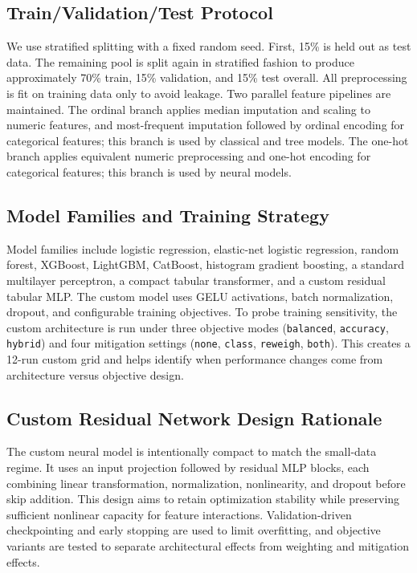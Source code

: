 ﻿\documentclass[11pt]{article}
\begin{document}
\subsection{Train/Validation/Test Protocol}
We use stratified splitting with a fixed random seed. First, 15\% is held out as test data. The remaining pool is split again in stratified fashion to produce approximately 70\% train, 15\% validation, and 15\% test overall. All preprocessing is fit on training data only to avoid leakage. Two parallel feature pipelines are maintained. The ordinal branch applies median imputation and scaling to numeric features, and most-frequent imputation followed by ordinal encoding for categorical features; this branch is used by classical and tree models. The one-hot branch applies equivalent numeric preprocessing and one-hot encoding for categorical features; this branch is used by neural models.

\subsection{Model Families and Training Strategy}
Model families include logistic regression, elastic-net logistic regression, random forest, XGBoost, LightGBM, CatBoost, histogram gradient boosting, a standard multilayer perceptron, a compact tabular transformer, and a custom residual tabular MLP. The custom model uses GELU activations, batch normalization, dropout, and configurable training objectives. To probe training sensitivity, the custom architecture is run under three objective modes (\texttt{balanced}, \texttt{accuracy}, \texttt{hybrid}) and four mitigation settings (\texttt{none}, \texttt{class}, \texttt{reweigh}, \texttt{both}). This creates a 12-run custom grid and helps identify when performance changes come from architecture versus objective design.

\subsection{Custom Residual Network Design Rationale}
The custom neural model is intentionally compact to match the small-data regime. It uses an input projection followed by residual MLP blocks, each combining linear transformation, normalization, nonlinearity, and dropout before skip addition. This design aims to retain optimization stability while preserving sufficient nonlinear capacity for feature interactions. Validation-driven checkpointing and early stopping are used to limit overfitting, and objective variants are tested to separate architectural effects from weighting and mitigation effects.
\end{document}
